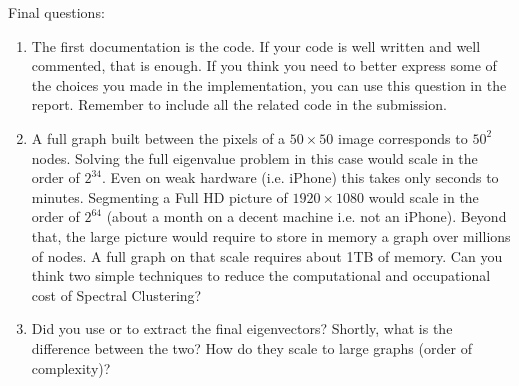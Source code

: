 \documentclass{article}
\begin{document}
Final questions:

\begin{enumerate}
    \item The first documentation is the code. If your code is well written
        and well commented, that is enough. If you think you need to better
        express some of the choices you made in the implementation,
        you can use this question in the report. Remember to include
        all the related code in the submission.
    \item A full graph built between the pixels of a $50 \times 50$ image
        corresponds to $50^2$ nodes. Solving the full eigenvalue problem
        in this case would scale in the order of $2^{34}$. Even on weak
        hardware (i.e. iPhone) this takes only seconds to minutes.
        Segmenting a Full HD picture of $1920 \times 1080$ would scale in the
        order of $2^{64}$ (about a month on a decent machine i.e. not an iPhone).
        Beyond that, the large picture would require
        to store in memory a graph over millions of nodes. A full graph
        on that scale requires about 1TB of memory. Can you think two simple
        techniques to reduce the computational and occupational cost of
        Spectral Clustering?
    \item Did you use  or  to extract the final eigenvectors?
        Shortly, what is the difference between the two?
        How do they scale to large graphs (order of complexity)?
\end{enumerate}




\end{document}
